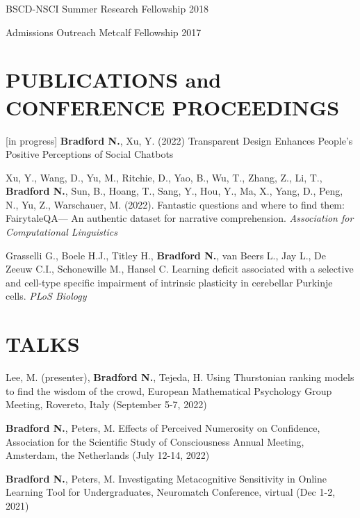 \documentclass[margin, 10pt]{res} %
\begin{document}
\begin{resume}
{BSCD-NSCI Summer Research Fellowship} \hfill 2018 

{Admissions Outreach Metcalf Fellowship} \hfill 2017 

 
\section{PUBLICATIONS and CONFERENCE PROCEEDINGS}

[in progress] \textbf{Bradford N.}, Xu, Y. (2022) Transparent Design Enhances People’s Positive Perceptions of Social Chatbots

Xu, Y., Wang, D., Yu, M., Ritchie, D., Yao, B., Wu, T., Zhang, Z., Li, T., \textbf{Bradford N.}, Sun, B., Hoang, T., Sang, Y., Hou, Y., Ma, X., Yang, D., Peng, N., Yu, Z., Warschauer, M. (2022). Fantastic questions and where to find them: FairytaleQA— An authentic dataset for narrative comprehension. {\sl Association for Computational Linguistics}

Grasselli G., Boele H.J., Titley H., \textbf{Bradford N.}, van Beers L., Jay L., De Zeeuw C.I., Schonewille M., Hansel C. Learning deficit associated with a selective and cell-type specific impairment of intrinsic plasticity in cerebellar Purkinje cells.  {\sl PLoS Biology}

\section{TALKS}
Lee, M. (presenter), \textbf{Bradford N.}, Tejeda, H. Using Thurstonian ranking models to find the wisdom of the crowd, European Mathematical Psychology Group Meeting, Rovereto, Italy (September 5-7, 2022)

\textbf{Bradford N.}, Peters, M. Effects of Perceived Numerosity on Confidence, Association for the Scientific Study of Consciousness Annual Meeting, Amsterdam, the Netherlands (July 12-14, 2022)

\textbf{Bradford N.}, Peters, M. Investigating Metacognitive Sensitivity in Online Learning Tool for Undergraduates, Neuromatch Conference, virtual (Dec 1-2, 2021)


\end{resume}
\end{document}
